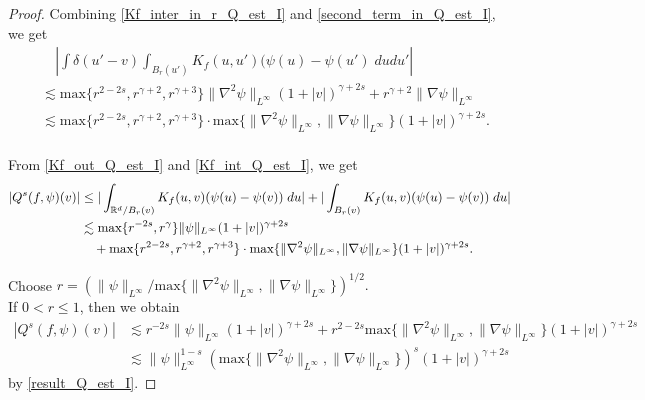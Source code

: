 \documentclass[10pt,a4paper]{amsart}
\begin{document}
\begin{proof}
\noindent Combining \eqref{Kf_inter_in_r_Q_est_I}
and \eqref{second_term_in_Q_est_I}, we get 
\begin{equation} \label{Kf_int_Q_est_I}
\begin{split}
&\quad|\int \delta(u'-v)\int_{B_r(u')} K_f(u,u')(\psi(u)-\psi(u')\;dudu'| \\
& \lesssim \text{max}\{r^{2-2s}, r^{\gamma+2},  r^{\gamma+3}\}
 \|\nabla^2 \psi\|_{L^\infty}(1+|v|)^{\gamma+2s}+r^{\gamma+2}\|\nabla \psi\|_{L^\infty}  \\
&\lesssim  \text{max}\{r^{2-2s}, r^{\gamma+2},  r^{\gamma+3}\} \cdot \text{max}\{\|\nabla^2 \psi\|_{L^\infty}, \|\nabla \psi\|_{L^\infty} \}(1+|v|)^{\gamma+2s}.  \\
\end{split} 
\end{equation} \vspace{3mm}

\noindent From \eqref{Kf_out_Q_est_I} and \eqref{Kf_int_Q_est_I}, we get
\begin{align} 
    |Q^{s}(f,\psi)(v)| &\leq    |\int_{\mathbb{R}^d/B_r(v)} K_f(u,v)(\psi(u)-\psi(v)) \; du| +
    |\int_{B_r(v)} K_f(u,v)(\psi(u)-\psi(v))\;du| \notag  \\ 
    &\lesssim
    \text{max}\{r^{-2s}, r^{\gamma}\} \|\psi\|_{L^{\infty}}(1+|v|)^{\gamma+2s} \label{result_Q_est_I} \\
    &\quad +\text{max}\{r^{2-2s}, r^{\gamma+2},  r^{\gamma+3}\} \cdot \text{max}\{\|\nabla^2 \psi\|_{L^\infty}, \|\nabla \psi\|_{L^\infty} \}(1+|v|)^{\gamma+2s}. \notag
\end{align} \vspace{3mm}

\noindent Choose $r=(\|\psi\|_{L^{\infty}}/\text{max}\{\|\nabla^2 \psi\|_{L^\infty}, \|\nabla \psi\|_{L^\infty} \})^{1/2}.$\\
\noindent If $0<r\leq 1$, then we obtain 
\begin{align*}
     |Q^{s}(f,\psi)(v)| &\lesssim r^{-2s}\|\psi\|_{L^{\infty}}(1+|v|)^{\gamma+2s} + r^{2-2s}\text{max}\{\|\nabla^2 \psi\|_{L^\infty}, \|\nabla \psi\|_{L^\infty} \}(1+|v|)^{\gamma+2s}\\
     &\lesssim  \|\psi\|_{L^{\infty}}^{1-s}(\text{max}\{\|\nabla^2 \psi\|_{L^\infty}, \|\nabla \psi\|_{L^\infty} \})^{s}(1+|v|)^{\gamma+2s}
\end{align*} by \eqref{result_Q_est_I}.\vspace{3mm} 


\end{proof}
\end{document}
